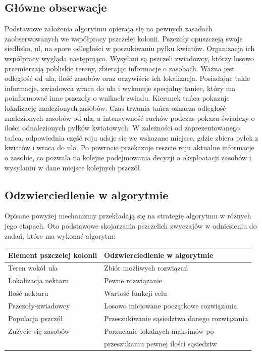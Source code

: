\documentclass[a4paper,12pt,notitlepage]{mwrep}
\begin{document}

\subsection{Główne obserwacje}
Podstawowe założenia algorytmu opierają się na pewnych zasadach zaobserwowanych we współpracy pszczelej kolonii.
Pszczoły opuszczeją swoje siedlisko, ul, na spore odległości w poszukiwaniu pyłku kwiatów.
Organizacja ich wspólpracy wygląda następująco. Wysyłani są pszczeli zwiadowcy, którzy losowo przemierzają pobliskie tereny,
zbierając informacje o zasobach. Ważna jest odległość od ula, ilość zasobów oraz oczywiście ich lokalizacja. Posiadając takie
informacje, zwiadowca wraca do ula i wykonuje specjalny taniec, który ma poinformować inne pszczoły o wnikach zwiadu.
Kierunek tańca pokazuje lokalizację znalezionych zasobów. Czas trwania tańca oznacza odległość znalezionych zasobów
od ula, a intensywność ruchów podczas pokazu świadczy o ilości odnalezionych pyłków kwiatowych. W zależności od zaprezentowanego
tańca, odpowiednia część roju udaje się we wskazane miejsce, gdzie zbiera pyłek z kwiatów i wraca do ula. Po powrocie przekazuje
reszcie roju aktualne informacje o zasobie, co pozwala na kolejne podejmowania decyzji o oksploatacji zasobów i wysyłaniu w dane
miejsce kolejnych pszczół.

\subsection{Odzwierciedlenie w algorytmie}
Opisane powyżej mechanizmy przekładają się na strategię algorytmu w różnych jego etapach.
Oto podstawowe skojarzania pszczelich zwyczajów w odniesieniu do zadań, które ma wykonać algorytm:\\

\begin{tabular}{|l|l|}
\hline
Element pszczelej kolonii & Odzwierciedlenie w algorytmie \\
\hline
Teren wokół ula & Zbiór możliwych rozwiązań \\
Lokalizacja nektaru & Pewne rozwiązanie \\
Ilość nektaru & Wartość funkcji celu \\
Pszczoły-zwiadowcy & Losowo inicjowane początkowe rozwiązania \\
Populacja pszczół & Przeszukiwanie sąsiedztwa danego rozwiązania \\
Zużycie się zasobów & Porzucanie lokalnych maksimów po \\
& przeszukaniu pewnej ilości sąsiedztw \\
\hline
\end{tabular}\\
\end{document}
